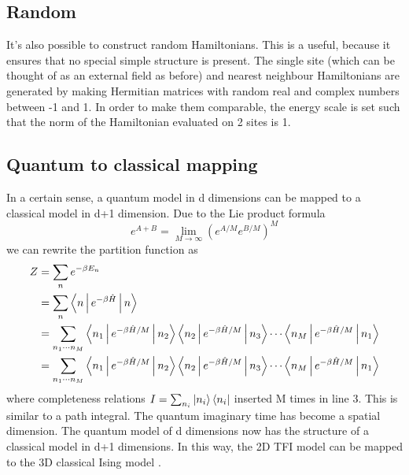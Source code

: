 \subsection{Random}\label{randhamexpl}
It's also possible to construct random Hamiltonians. This is a useful, because it ensures that no special simple structure is present. The single site (which can be thought of as an external field as before) and nearest neighbour Hamiltonians are generated by making Hermitian matrices with random real and complex numbers between -1 and 1. In order to make them comparable, the energy scale is set such that the norm of the Hamiltonian evaluated on 2 sites is 1.

\subsection{Quantum to classical mapping}\label{q2cmap}

In a certain sense, a quantum model in d dimensions can be mapped to a classical model in d+1 dimension. Due to the Lie product formula
\begin{equation}
    e^{A+B} = \lim_{M \to \infty } ( e^{A/M} e^{B/M}  )^M
\end{equation}
we can rewrite the partition function as
\begin{equation}
    \begin{split}
        Z &= \sum_n e^{ - \beta E_n} \\
        &= \sum_n \Braket{n | e^{ - \beta \hat{H} }  | n} \\
        &= \sum_{n_1 \cdots n_M} \Braket{n_1 | e^{ - \beta \hat{H} /M}  | n_2}  \Braket{n_2 | e^{ - \beta \hat{H} /M }  | n_3} \cdots  \Braket{n_{M} | e^{ - \beta \hat{H} /M }  | n_1} \\
        &= \sum_{  n_1 \cdots n_M} \Braket{n_1 | e^{ - \beta \hat{H} /M}  | n_2}  \Braket{n_2 | e^{ - \beta \hat{H} /M }  | n_3} \cdots  \Braket{n_{M} | e^{ - \beta \hat{H} /M }  | n_1} \\
    \end{split}
\end{equation}
where completeness relations $ I = \sum_{n_i}  \ket{ n_i } \bra{ n_i}  $ inserted M times in line 3. This is similar to a path integral. The quantum imaginary time has become a spatial dimension. The quantum model of d dimensions now has the structure of a classical model in d+1 dimensions. In this way, the 2D \Gls{TFI} model can be mapped to the 3D classical Ising model \cite{Hsieh}.